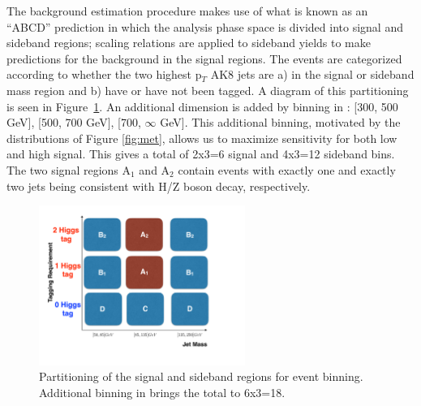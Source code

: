 The background estimation procedure makes use of what is known as an ``ABCD'' prediction in which the analysis phase space is divided into signal and sideband regions; scaling relations are applied to sideband yields to make predictions for the background in the signal regions. The events are categorized according to whether the two highest p$_{T}$ AK8 jets are a) in the signal or sideband mass region and b) have or have not been \bbbar tagged. A diagram of this partitioning is seen in Figure~\ref{fig:abcd}. An additional dimension is added by binning in \ptmiss: [300, 500 GeV], [500, 700 GeV], [700, $\infty$ GeV]. This additional binning, motivated by the \ptmiss distributions of Figure \ref{fig:met}, allows us to maximize sensitivity for both low and high \ptmiss signal. This gives a total of 2x3=6 signal and 4x3=12 sideband bins. The two signal regions A$_{1}$ and A$_{2}$ contain events with exactly one and exactly two jets being consistent with H/Z boson decay, respectively.

\begin{figure}
\centering
\includegraphics[width=0.6\textwidth]{figs/CMS-SUS-17-006_Figure-aux_002.pdf}
\caption[Partitioning of the signal and sideband regions for event binning.]{Partitioning of the signal and sideband regions for event binning. Additional binning in \ptmiss brings the total to 6x3=18.}
\label{fig:abcd}
\end{figure}

